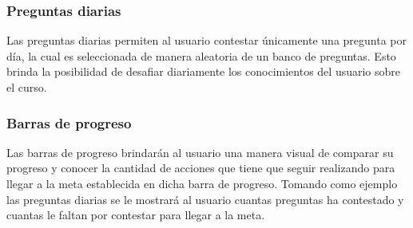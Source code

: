 \subsubsection{Preguntas diarias}

Las preguntas diarias permiten al usuario contestar únicamente una pregunta por día,
la cual es seleccionada de manera aleatoria de un banco de preguntas. 
Esto brinda la posibilidad de desafiar diariamente los conocimientos del usuario sobre el curso.

\subsubsection{Barras de progreso}

Las barras de progreso brindarán al usuario una manera visual de comparar su progreso y conocer
 la cantidad de acciones que tiene que seguir realizando para llegar a la meta establecida en dicha barra de progreso.
Tomando como ejemplo las preguntas diarias se le mostrará al usuario cuantas preguntas ha contestado 
y cuantas le faltan por contestar para llegar a la meta.


%



